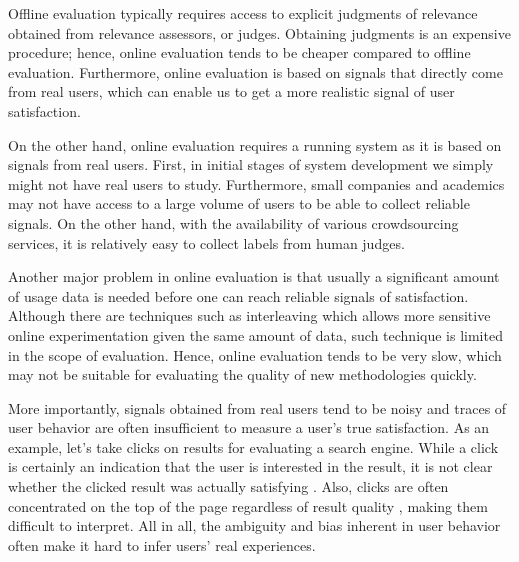 Offline evaluation typically requires access to explicit judgments of relevance obtained from relevance assessors, or judges. Obtaining judgments is an expensive procedure; hence, online evaluation tends to be cheaper compared to offline evaluation. Furthermore, online evaluation is based on signals that directly come from real users, which can enable us to get a more realistic signal of user satisfaction. 

On the other hand, online evaluation requires a running system as it is based on signals from real users. First, in initial stages of system development we simply might not have real users to study. Furthermore, small companies and academics may not have access to a large volume of users to be able to collect reliable signals. On the other hand, with the availability of various crowdsourcing services, it is relatively easy to collect labels from human judges.

Another major problem in online evaluation is that usually a significant amount of usage data is needed before one can reach reliable signals of satisfaction. Although there are techniques such as interleaving \citep{radl:comp10} which allows more sensitive online experimentation given the same amount of data, such technique is limited in the scope of evaluation. Hence, online evaluation tends to be very slow, which may not be suitable for evaluating the quality of new methodologies quickly. %

More importantly, signals obtained from real users tend to be noisy and traces of user behavior are often insufficient to measure a user's true satisfaction. As an example, let's take clicks on results for evaluating a search engine. While a click is certainly an indication that the user is interested in the result, it is not clear whether the clicked result was actually satisfying \citep{Kim2016}. Also, clicks are often concentrated on the top of the page regardless of result quality \citep{radlinski2006minimally}, making them difficult to interpret. All in all, the ambiguity and bias inherent in user behavior often make it hard to infer users' real experiences.   

